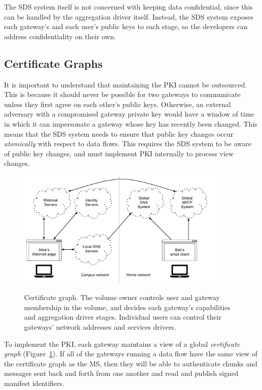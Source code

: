 The SDS system itself is not concerned with keeping data
confidential, since this can be handled by the aggregation driver itself.
Instead, the SDS system exposes each gateway's and each user's public keys to
each stage, so the developers can address confidentiality on their own.

\subsection{Certificate Graphs}

It is important to understand that maintaining the PKI cannot be outsourced.
This is because it should never be possible for two
gateways to communicate unless they first agree on each other's public keys.
Otherwise, an external adversary with a compromised gateway private key
would have a window of time in which it can
impersonate a gateway whose key has recently been changed.  This means that the
SDS system needs to ensure that public key changes occur \emph{atomically} with respect
to data flows.  This requires the SDS system to be aware of public key changes,
and must implement PKI internally to 
process view changes.

\begin{figure}[h!]
   \caption{Certificate graph.  The volume owner controls user and gateway
   membership in the volume, and decides each gateway's capabilities and
   aggregation driver stages.  Individual users can control their gateways'
   network addresses and services drivers.}
   \centering
   \includegraphics[width=0.9\textwidth,page=13]{figures/dissertation-figures}
   \label{fig:chap2-certificate-graph}
\end{figure}

To implement the PKI, each gateway maintains a view of a global \emph{certificate
graph} (Figure~\ref{fig:chap2-certificate-graph}).  If all
of the gateways running a data flow have the same view of the certificate graph
as the MS, then they will be able to authenticate chunks and messages sent back and forth from one another
and read and publish signed manifest identifiers.

